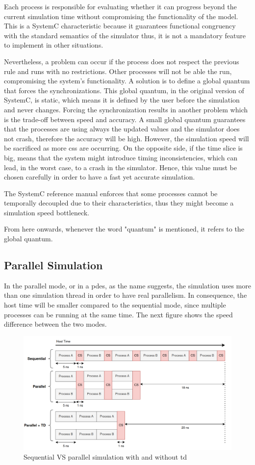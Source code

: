 Each process is responsible for evaluating whether it can progress beyond the current simulation time without compromising the functionality 
of the model. This is a SystemC characteristic because it guarantees functional congruency with the standard semantics of the simulator thus, 
it is not a mandatory feature to implement in other situations. 

Nevertheless, a problem can occur if the process does not respect the previous rule and runs with no restrictions. Other processes will not be 
able the run, compromising the system's functionality. A solution is to define a global quantum that forces the synchronizations. This global 
quantum, in the original version of SystemC, is static, which means it is defined by the user before the simulation and never changes. Forcing 
the synchronization results in another problem which is the trade-off between speed and accuracy. A small global quantum guarantees that the 
processes are using always the updated values and the simulator does not crash, therefore the accuracy will be high. However, the simulation 
speed will be sacrificed as more \glspl{cs} are occurring. On the opposite side, if the time slice is big, means that the system might introduce 
timing inconsistencies, which can lead, in the worst case, to a crash in the simulator. Hence, this value must be chosen carefully in order to 
have a fast yet accurate simulation.  

The SystemC reference manual \cite{SystemC} enforces that some processes cannot be temporally decoupled due to their characteristics, thus 
they might become a simulation speed bottleneck. 

From here onwards, whenever the word "quantum" is mentioned, it refers to the global quantum.

\subsection{Parallel Simulation}

In the parallel mode, or in a \gls{pdes}, as the name suggests, the simulation uses more than one simulation thread in order to have real 
parallelism. In consequence, the host time will be smaller compared to the sequential mode, since multiple processes can be running at the 
same time. The next figure shows the speed difference between the two modes.

\begin{figure}[H]
	\centering
 	\includegraphics[width=0.8\linewidth]{Images/ParallelSimulation.png}
 	\caption{Sequential VS parallel simulation with and without \gls{td}}
	 \label{fig_ParallelSimulation}
\end{figure}


